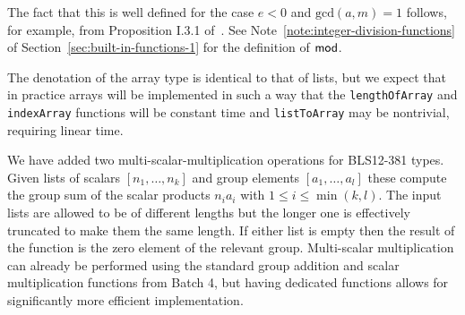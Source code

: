 \noindent The fact that this is well defined for the case $e<0$ and $\mathrm{gcd}(a,m) = 1$
follows, for example, from Proposition I.3.1 of~\cite{Koblitz-GTM}.  See
Note~\ref{note:integer-division-functions} of
Section~\ref{sec:built-in-functions-1} for the definition of $\operatorname{\mathsf{mod}}$.

\label{note:array-semantics}
The denotation of the array type is identical to that of lists, but we expect
that in practice arrays will be implemented in such a way that the
\texttt{lengthOfArray} and \texttt{indexArray} functions will be constant time and
\texttt{listToArray} may be nontrivial, requiring linear time.

\label{note:msm-semantics}
We have added two multi-scalar-multiplication operations for BLS12-381
types. Given lists of scalars $[n_1, \ldots, n_k]$ and group elements
$[a_1, \ldots, a_l]$ these compute the group sum of the scalar products $n_ia_i$
with $1 \leq i \leq \min(k,l)$. The input lists are allowed to be of different
lengths but the longer one is effectively truncated to make them the same
length.  If either list is empty then the result of the function is the zero
element of the relevant group.  Multi-scalar multiplication can already be
performed using the standard group addition and scalar multiplication functions
from Batch 4, but having dedicated functions allows for significantly more
efficient implementation.
